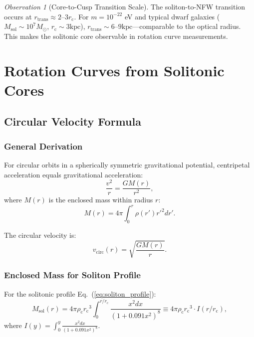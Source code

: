 \documentclass[11pt,a4paper]{article}
\newcommand{\Msun}{\ensuremath{M_\odot}}
\newcommand{\Msol}{\ensuremath{M_{\mathrm{sol}}}}
\newcommand{\kpc}{\ensuremath{\mathrm{kpc}}}
\newcommand{\rc}{\ensuremath{r_{\mathrm{c}}}}
\newcommand{\rhoc}{\ensuremath{\rho_{\mathrm{c}}}}
\newcommand{\vcirc}{\ensuremath{v_{\mathrm{circ}}}}
\theoremstyle{definition}
\theoremstyle{remark}
\newtheorem{observation}{Observation}[section]
\begin{document}
\begin{observation}[Core-to-Cusp Transition Scale]
The soliton-to-NFW transition occurs at $r_{\mathrm{trans}} \approx 2$--$3\rc$. For $m = 10^{-22}$ eV and typical dwarf galaxies ($\Msol \sim 10^7 \Msun$, $\rc \sim 3 \kpc$), $r_{\mathrm{trans}} \sim 6$--$9 \kpc$---comparable to the optical radius. This makes the solitonic core observable in rotation curve measurements.
\end{observation}

\section{Rotation Curves from Solitonic Cores}
\label{sec:rotation_curves}

\subsection{Circular Velocity Formula}
\label{sec:vcirc_derivation}

\subsubsection{General Derivation}

For circular orbits in a spherically symmetric gravitational potential, centripetal acceleration equals gravitational acceleration:
\begin{equation}
\frac{v^2}{r} = \frac{GM(r)}{r^2},
\end{equation}
where $M(r)$ is the enclosed mass within radius $r$:
\begin{equation}
M(r) = 4\pi \int_0^r \rho(r') r'^2 dr'.
\end{equation}

The circular velocity is:
\begin{equation}
\label{eq:vcirc_general}
\boxed{\vcirc(r) = \sqrt{\frac{GM(r)}{r}}.}
\end{equation}

\subsubsection{Enclosed Mass for Soliton Profile}

For the solitonic profile Eq.~(\ref{eq:soliton_profile}):
\begin{equation}
M_{\mathrm{sol}}(r) = 4\pi \rhoc \rc^3 \int_0^{r/\rc} \frac{x^2 dx}{(1 + 0.091 x^2)^8} \equiv 4\pi \rhoc \rc^3 \cdot I(r/\rc),
\end{equation}
where $I(y) = \int_0^y \frac{x^2 dx}{(1 + 0.091 x^2)^8}$.
\end{document}
